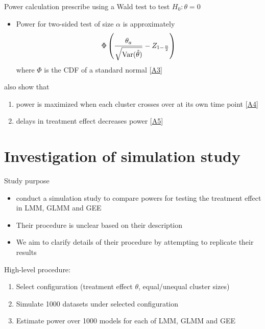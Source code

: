 \documentclass[9pt]{beamer}
\begin{document}
\begin{frame}{Power calculation} \label{slide:power}
\citet{Hussey:2007} prescribe using a Wald test to test $H_0:\theta=0$
\begin{itemize}
\item
Power for two-sided test of size $\alpha$ is approximately
\[
\Phi\left(\frac{\theta_a}{\sqrt{\mathrm{Var}(\hat{\theta})}} - Z_{1-\frac{\alpha}{2}}\right)
\]
where $\Phi$ is the CDF of a standard normal [\hyperlink{apx:power}{\color{red}A3}]
\end{itemize}
\vspace{2em}

\citet{Hussey:2007} also show that
\begin{enumerate}

\item
power is maximized when each cluster crosses over at its own time point [\hyperlink{apx:timepoints}{\color{red}A4}]

\item
delays in treatment effect decreases power [\hyperlink{apx:delay}{\color{red}A5}]

\end{enumerate}
\end{frame}



\section{Investigation of simulation study}



\begin{frame}{Study purpose}
\begin{itemize}
\setlength\itemsep{2em}

\item
\citet{Hussey:2007} conduct a simulation study to compare powers for testing the treatment effect in LMM, GLMM and GEE

\item
Their procedure is unclear based on their description

\item
We aim to clarify details of their procedure by attempting to replicate their results

\end{itemize}
\vspace{2em}

High-level procedure:
\begin{enumerate}
\item
Select configuration (treatment effect $\theta$, equal/unequal cluster sizes)
\item
Simulate 1000 datasets under selected configuration
\item
Estimate power over 1000 models for each of LMM, GLMM and GEE
\end{enumerate}
\end{frame}
\end{document}
